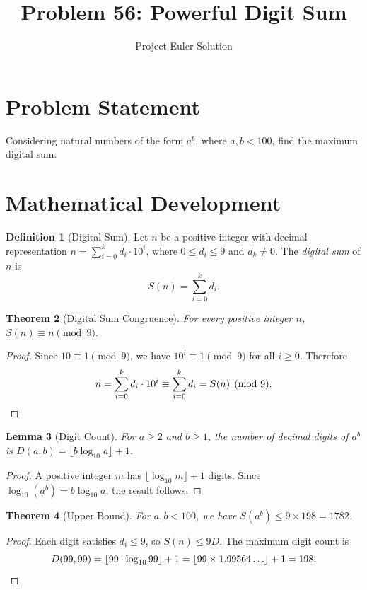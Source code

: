 \documentclass[12pt,a4paper]{article}
\title{Problem 56: Powerful Digit Sum}
\author{Project Euler Solution}
\date{}
\newtheorem{theorem}{Theorem}
\newtheorem{lemma}[theorem]{Lemma}
\theoremstyle{definition}
\newtheorem{definition}[theorem]{Definition}
\theoremstyle{remark}
\begin{document}
\maketitle

\section{Problem Statement}
Considering natural numbers of the form $a^b$, where $a, b < 100$, find the maximum digital sum.

\section{Mathematical Development}

\begin{definition}[Digital Sum]
Let $n$ be a positive integer with decimal representation $n = \sum_{i=0}^{k} d_i \cdot 10^i$, where $0 \leq d_i \leq 9$ and $d_k \neq 0$. The \emph{digital sum} of $n$ is
\[
S(n) = \sum_{i=0}^{k} d_i.
\]
\end{definition}

\begin{theorem}[Digital Sum Congruence]
For every positive integer $n$, $S(n) \equiv n \pmod{9}$.
\end{theorem}

\begin{proof}
Since $10 \equiv 1 \pmod{9}$, we have $10^i \equiv 1 \pmod{9}$ for all $i \geq 0$. Therefore
\[
n = \sum_{i=0}^{k} d_i \cdot 10^i \equiv \sum_{i=0}^{k} d_i = S(n) \pmod{9}. \qedhere
\]
\end{proof}

\begin{lemma}[Digit Count]
For $a \geq 2$ and $b \geq 1$, the number of decimal digits of $a^b$ is $D(a,b) = \lfloor b \log_{10} a \rfloor + 1$.
\end{lemma}

\begin{proof}
A positive integer $m$ has $\lfloor \log_{10} m \rfloor + 1$ digits. Since $\log_{10}(a^b) = b \log_{10} a$, the result follows.
\end{proof}

\begin{theorem}[Upper Bound]
For $a, b < 100$, we have $S(a^b) \leq 9 \times 198 = 1782$.
\end{theorem}

\begin{proof}
Each digit satisfies $d_i \leq 9$, so $S(n) \leq 9D$. The maximum digit count is
\[
D(99, 99) = \lfloor 99 \cdot \log_{10} 99 \rfloor + 1 = \lfloor 99 \times 1.99564\ldots \rfloor + 1 = 198. \qedhere
\]
\end{proof}
\end{document}
